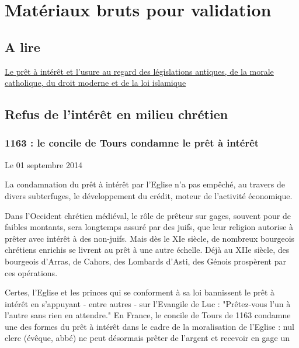 \chapter{Matériaux bruts pour validation}

\section{A lire}
\href{https://www.persee.fr/doc/ridc_0035-3337\_1955\_num\_7\_3\_9521}{Le prêt à intérêt et l'usure au regard des législations antiques, de la morale catholique, du droit moderne et de la loi islamique }

\section{Refus de l'intérêt en milieu chrétien}

\subsection{1163 : le concile de Tours condamne le prêt à intérêt}


Le 01 septembre 2014

La condamnation du prêt à intérêt par l'Eglise n'a pas empêché, au travers de divers subterfuges, le développement du crédit, moteur de l'activité économique.

Dans l’Occident chrétien médiéval, le rôle de prêteur sur gages, souvent pour de faibles montants, sera longtemps assuré par des juifs, que leur religion autorise à prêter avec intérêt à des non-juifs. Mais dès le XIe siècle, de nombreux bourgeois chrétiens enrichis se livrent au prêt à une autre échelle. Déjà au XIIe siècle, des bourgeois d’Arras, de Cahors, des Lombards d’Asti, des Génois prospèrent par ces opérations.

Certes, l’Eglise et les princes qui se conforment à sa loi bannissent le prêt à intérêt en s’appuyant - entre autres - sur l’Evangile de Luc : "Prêtez-vous l’un à l’autre sans rien en attendre." En France, le concile de Tours de 1163 condamne une des formes du prêt à intérêt dans le cadre de la moralisation de l’Eglise : nul clerc (évêque, abbé) ne peut désormais prêter de l’argent et recevoir en gage un

